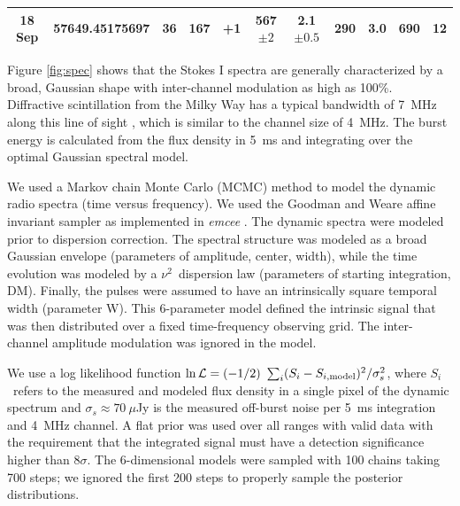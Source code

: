 \documentclass[twocolumn]{aastex61}
\begin{document}
\begin{table}
\begin{tabular}{cc|rrr|ccrrrr}
18 Sep\tablenotemark{a} & 57649.45175697   & 36 		& 167 & +1			& 567$\pm2$ 		& 2.1$\pm0.5$		 	& 290 		& 3.0 		& 690 & 12 			\\ \hline
\end{tabular}
\label{tab:spec}
\end{table} 

Figure \ref{fig:spec} shows that the Stokes I spectra are generally characterized by a broad, Gaussian shape with inter-channel modulation as high as 100\%. Diffractive scintillation from the Milky Way has a typical bandwidth of 7~MHz along this line of sight \citep{2002astro.ph..7156C}, which is similar to the channel size of 4~MHz. The burst energy is calculated from the flux density in 5~ms and integrating over the optimal Gaussian spectral model.

We used a Markov chain Monte Carlo (MCMC) method to model the dynamic radio spectra (time versus frequency). We used the Goodman and Weare affine invariant sampler \citep{goodman2010ensemble} as implemented in \emph{emcee} \citep{2013PASP..125..306F}. The dynamic spectra were modeled prior to dispersion correction. The spectral structure was modeled as a broad Gaussian envelope (parameters of amplitude, center, width), while the time evolution was modeled by a $\nu^2$\ dispersion law (parameters of starting integration, DM). Finally, the pulses were assumed to have an intrinsically square temporal width (parameter W). This 6-parameter model defined the intrinsic signal that was then distributed over a fixed time-frequency observing grid. The inter-channel amplitude modulation was ignored in the model.

We use a log likelihood function $\ln \mathcal{L}=(-1/2)\ \sum_i (S_i - S_{i, \rm{model}})^2/\sigma_s^2$, where $S_i$\ refers to the measured and modeled flux density in a single pixel of the dynamic spectrum and $\sigma_s\approx 70\ \mu$Jy is the measured off-burst noise per 5~ms integration and 4~MHz channel. A flat prior was used over all ranges with valid data with the requirement that the integrated signal must have a detection significance higher than 8$\sigma$. The 6-dimensional models were sampled with 100 chains taking 700 steps; we ignored the first 200 steps to properly sample the posterior distributions. 
\end{document}
